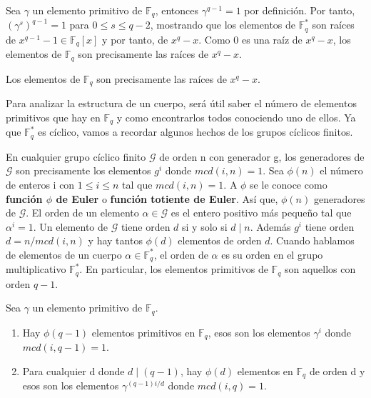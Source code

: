 Sea $\gamma$ un elemento primitivo de $\mathbb{F}_q$, entonces $\gamma^{q-1} = 1$ por definición. Por tanto, $(\gamma^s)^{q-1} = 1$ para $0 \leq s \leq q-2$, mostrando que los elementos de $\mathbb{F}_q^*$ son raíces de $x^{q-1}-1 \in \mathbb{F}_q[x]$ y por tanto, de $x^q-x$. Como $0$ es una raíz de $x^q-x$, los elementos de $\mathbb{F}_q$ son precisamente las raíces de $x^q-x$.

\begin{theorem}
\label{th:elementos_cuerpo}
Los elementos de $\mathbb{F}_q$ son precisamente las raíces de $x^q-x$.
\end{theorem}


Para analizar la estructura de un cuerpo, será útil saber el número de elementos primitivos que hay en $\mathbb{F}_q$ y como encontrarlos todos conociendo uno de ellos. Ya que $\mathbb{F}_q^*$ es cíclico, vamos a recordar algunos hechos de los grupos cíclicos finitos.

En cualquier grupo cíclico finito $\mathcal{G}$ de orden n con generador g,  los generadores de $\mathcal{G}$ son precisamente los elementos $g^i$ donde $mcd(i,n) = 1$. Sea $\phi(n)$ el número de enteros i con $ 1 \leq i \leq n$ tal que $mcd(i,n) = 1$. A $\phi$ se le conoce como \textbf{función $\phi$ de Euler} o \textbf{función totiente de Euler}. Así que, $\phi(n)$ generadores de $\mathcal{G}$. El orden de un elemento   $\alpha \in \mathcal{G}$  es el entero positivo más pequeño tal que $\alpha^i = 1$. Un elemento de $\mathcal{G}$ tiene orden $d$ si y solo si $d \mid n$. Además $g^i$ tiene orden $d = n/mcd(i,n)$ y hay tantos $\phi(d)$ elementos de orden $d$. Cuando hablamos de elementos de un cuerpo $\alpha \in \mathbb{F}_q^*$, el orden de $\alpha$ es su orden en el grupo multiplicativo $\mathbb{F}_q^*$. En particular, los elementos primitivos de $\mathbb{F}_q$ son aquellos con orden $q-1$.


\begin{theorem}
Sea $\gamma$ un elemento primitivo de $\mathbb{F}_q$.
\begin{enumerate}
	\item Hay $\phi(q-1)$ elementos primitivos en $\mathbb{F}_q$, esos son los elementos $\gamma^i$ donde $mcd(i,q-1)=1$.
	\item Para cualquier d donde $d \mid (q-1)$, hay $\phi(d)$ elementos en $\mathbb{F}_q$ de orden d y esos son los elementos $\gamma^{(q-1)i/d}$ donde $mcd(i,q) = 1$.
\end{enumerate}
\end{theorem}


